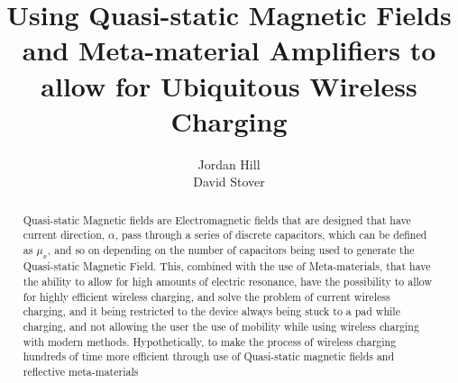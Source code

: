 \documentclass[]{article}
\title{Using Quasi-static Magnetic Fields and Meta-material Amplifiers to allow for Ubiquitous Wireless Charging}
\author{Jordan Hill \\ David Stover}
\begin{document}
	
\maketitle

\pagebreak

\begin{abstract}
Quasi-static Magnetic fields are Electromagnetic fields that are designed that have current direction, $\alpha$, pass through a series of discrete capacitors, which can be defined as $\mu_{x}$, and so on depending on the number of capacitors being used to generate the Quasi-static Magnetic Field. This, combined with the use of Meta-materials, that have the ability to allow for high amounts of electric resonance, have the possibility to allow for highly efficient wireless charging, and solve the problem of current wireless charging, and it being restricted to the device always being stuck to a pad while charging, and not allowing the user the use of mobility while using wireless charging with modern methods. Hypothetically, to make the process of wireless charging hundreds of time more efficient through use of Quasi-static magnetic fields and reflective meta-materials 
\end{abstract}

\pagebreak
\end{document}
